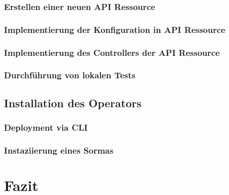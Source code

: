\documentclass[a4paper,11pt]{article}
\begin{document}
      \subsubsection{Erstellen einer neuen API Ressource}
      \subsubsection{Implementierung der Konfiguration in API Ressource}
      \subsubsection{Implementierung des Controllers der API Ressource}
      \subsubsection{Durchführung von lokalen Tests}
    \subsection{Installation des Operators}
      \subsubsection{Deployment via CLI}
      \subsubsection{Instaziierung eines Sormas}
  \section{Fazit}
\end{document}
